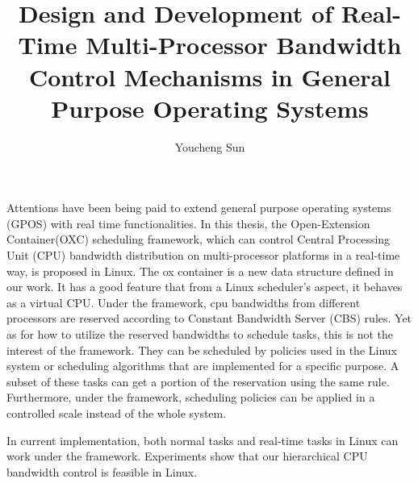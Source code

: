 \documentclass[a4paper, 12pt, openright, oneside, final]{book}%
\title{Design and Development of Real-Time Multi-Processor Bandwidth
  Control Mechanisms in General Purpose Operating Systems}
\author{Youcheng Sun}
\newcommand{\fncyblank}{\fancyhf{}}
\newenvironment{abstract}%
{\cleardoublepage\fncyblank\null\vfill\begin{center}%
\bfseries\abstractname\end{center}}%
{\vfill\null}
\begin{document}
\frontmatter


%

\begin{abstract}


  Attentions have been being paid to extend general purpose operating
  systems (GPOS) with real time functionalities. In this thesis, the
  Open-Extension Container(OXC) scheduling framework, which can control 
  Central Processing Unit (CPU) bandwidth distribution on multi-processor 
  platforms in a real-time way, is proposed in Linux. The ox container 
  is a new data structure defined in our work. It has a good feature 
  that from a Linux scheduler's aspect, it behaves as a virtual CPU.  
  Under the framework, cpu bandwidths from different processors are 
  reserved according to Constant Bandwidth Server (CBS) rules.  Yet 
  as for how to utilize the reserved bandwidths to schedule tasks, 
  this is not the interest of the framework. They can be scheduled by 
  policies used in the Linux system or scheduling algorithms that are 
  implemented for a specific purpose. A subset of these tasks can get 
  a portion of the reservation using the same rule.  Furthermore, under 
  the framework, scheduling policies can be applied in a controlled scale 
  instead of the whole system.

  In current implementation, both normal tasks and real-time tasks in
  Linux can work under the framework. Experiments show that our 
  hierarchical CPU bandwidth control is feasible in Linux.
\end{abstract}

\tableofcontents
\listoffigures

\mainmatter







\end{document}
